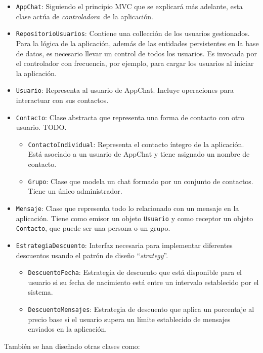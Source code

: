 \documentclass[11pt]{article}
\begin{document}
\begin{itemize}
	\item \texttt{AppChat}: Siguiendo el principio MVC que se explicará más adelante, esta clase actúa de \guillemotleft \textit{controladora}\guillemotright \ de la aplicación.
	\item \texttt{RepositorioUsuarios}: Contiene una collección de los usuarios gestionados. Para la lógica de la aplicación, además de las entidades persistentes en la base de datos, es necesario llevar un control de todos los usuarios. Es invocada por el controlador con frecuencia, por ejemplo, para cargar los usuarios al iniciar la aplicación.
	\item \texttt{Usuario}: Representa al usuario de AppChat. Incluye operaciones para interactuar con sus contactos.
	\item \texttt{Contacto}: Clase abstracta que representa una forma de contacto con otro usuario. TODO.
	\begin{itemize}
		\item \texttt{ContactoIndividual}: Representa el contacto íntegro de la aplicación. Está asociado a un usuario de AppChat y tiene asignado un nombre de contacto.
		\item \texttt{Grupo}: Clase que modela un chat formado por un conjunto de contactos. Tiene un único administrador.
	\end{itemize}
	\item \texttt{Mensaje}: Clase que representa todo lo relacionado con un mensaje en la aplicación. Tiene como emisor un objeto \texttt{Usuario} y como receptor un objeto \texttt{Contacto}, que puede ser una persona o un grupo.
	\item \texttt{EstrategiaDescuento}: Interfaz necesaria para implementar diferentes descuentos usando el patrón de diseño ``\textit{strategy}''.
    \begin{itemize}
		\item \texttt{DescuentoFecha}: Estrategia de descuento que está disponible para el usuario si su fecha de nacimiento está entre un intervalo establecido por el sistema.
		\item \texttt{DescuentoMensajes}: Estrategia de descuento que aplica un porcentaje al precio base si el usuario supera un límite establecido de mensajes enviados en la aplicación.
	\end{itemize}
\end{itemize}

También se han diseñado otras clases como:
\end{document}
